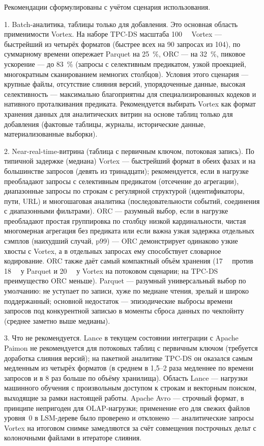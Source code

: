 Рекомендации сформулированы с учётом сценария использования.

1. Batch-аналитика, таблицы только для добавления. Это основная
область применимости Vortex. На наборе TPC-DS масштаба \SI{100}{\giga\byte} Vortex
--- быстрейший из четырёх форматов (быстрее всех на \num{90} запросах из \num{104}),
по суммарному времени опережает Parquet на \SI{25}{\percent}, ORC --- на
\SI{32}{\percent}, пиковое ускорение --- до \SI{83}{\percent} (запросы с селективным
предикатом, узкой проекцией, многократным сканированием немногих столбцов). Условия
этого сценария --- крупные файлы, отсутствие слияния версий, упорядоченные данные,
высокая селективность --- максимально благоприятны для специализированных кодеков и
нативного проталкивания предиката. Рекомендуется выбирать Vortex как
формат хранения данных для аналитических витрин на основе таблиц только для
добавления (фактовые таблицы, журналы, исторические данные, материализованные
выборки).

2. Near-real-time-витрина (таблица с первичным ключом, потоковая запись).
По типичной задержке (медиана) Vortex --- быстрейший формат в обеих фазах
и на большинстве запросов (девять из тринадцати); рекомендуется, если в нагрузке
преобладают запросы с селективным предикатом (отсечение до агрегации), диапазонные
запросы по строкам с регулярной структурой (идентификаторы, пути, URL) и
многошаговая аналитика (последовательности событий, соединения с диапазонными
фильтрами). ORC --- разумный выбор, если в нагрузке преобладают простая
группировка по столбцу низкой кардинальности, чистая многомерная агрегация без
предиката или если важна узкая задержка отдельных сэмплов (наихудший случай, p99) ---
ORC демонстрирует одинаково узкие хвосты с Vortex, а в отдельных запросах ему
способствует словарное кодирование. ORC также даёт самый компактный объём хранения
(\SI{17}{\giga\byte} против \SI{18}{\giga\byte} у Parquet и \SI{20}{\giga\byte} у
Vortex на потоковом сценарии; на TPC-DS преимущество ORC меньше). Parquet
--- разумный универсальный выбор по умолчанию: не уступает по записи, хуже по
медиане чтения, зрелый и широко поддержанный; основной недостаток --- эпизодические
выбросы времени запросов под конкурентной записью в моменты сброса данных по
чекпойнту (среднее заметно выше медианы).

3. Что не рекомендуется. Lance в текущем состоянии интеграции с
Apache Paimon не рекомендуется для потоковых таблиц с первичным ключом (требуется
доработка слияния версий); на пакетной аналитике TPC-DS он оказался самым медленным
из четырёх форматов (в среднем в 1{,}5--2 раза медленнее по времени запросов и в
8 раз больше по объёму хранилища). Область Lance --- нагрузки машинного обучения с
произвольным доступом к строкам и векторным поиском, выходящие за рамки настоящей
работы. Apache Avro ---
строчный формат, в принципе непригоден для OLAP-нагрузки; применение его для
свежих файлов уровня~0 в LSM-дереве было проверено и отклонено --- аналитические
запросы Vortex на итоговом снимке замедляются за счёт совмещения построчных дельт
с колоночными файлами в итераторе слияния.

